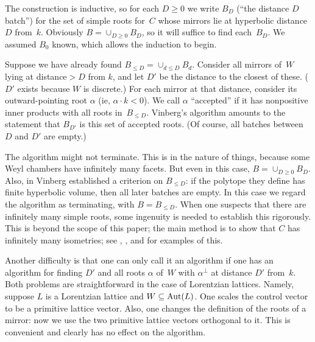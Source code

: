 \documentclass[12pt]{amsart}
\def\Aut{\mathop{\rm Aut}\nolimits}
\def\sset{\subseteq}
\numberwithin{theorem}{section}
\numberwithin{equation}{section}
\numberwithin{figure}{section}
\theoremstyle{remark}
\begin{document}
The construction is inductive, so for each 
$D\geq0$ we write $B_D$ (``the distance $D$ batch'') for the set 
of simple roots for~$C$ whose mirrors lie at hyperbolic distance~$D$
from~$k$.  Obviously  $B=\cup_{D\geq0}B_D$,
so it will suffice to find each~$B_D$.
We assumed $B_0$ known, which allows the induction to begin.

Suppose we have already found $B_{\leq D}=\cup_{d\leq D}B_{d}$.
Consider
all mirrors of~$W$ lying at distance${}>D$ from $k$, and let $D'$
be the distance to the closest of these.  ($D'$ exists because $W$ is discrete.)
For each mirror at that distance, consider its
outward-pointing root $\alpha$ (ie, $\alpha\cdot k<0$). We call $\alpha$ ``accepted''
if it has nonpositive inner products with 
all roots in~$B_{\leq D}$.   
Vinberg's algorithm amounts to the statement that $B_{D'}$ is this
set of accepted roots.  
(Of course, all batches between $D$ and
$D'$ are empty.)  

\medskip
The algorithm
might not terminate.  This is in the nature of things, because some
Weyl chambers have infinitely many facets.  
But even in this case, $B=\cup_{D\geq0}B_D$.
Also, in \cite[Prop.~5]{VinbergOnTheGroups}
Vinberg established a criterion on $B_{\leq D}$:  if the polytope they
define has finite hyperbolic volume,  then
all later batches are empty. 
In this case we regard the algorithm as terminating, with 
$B=B_{\leq D}$.
When one suspects that there are infinitely many simple roots,
some  ingenuity is needed to establish this rigorously.  
This is beyond the scope of this paper;   the
main method is to show that $C$ has infinitely many isometries;
see \cite[Theorem~5.5]{BorcherdsAutsOfLorentzianLattices}, 
\cite[II\S3]{NikulinRank3}, 
\cite[p.~20]{AllcockRank3} and 
\cite[Prop.~3.2]{ScharlauWalhorn} for examples of this.

\medskip
Another difficulty is that one can only call it an algorithm
if  one has an algorithm
for finding $D'$ and all roots $\alpha$ of~$W$ with $\alpha^\perp$ at 
distance $D'$ from~$k$.  
Both problems are straightforward in the case  of Lorentzian lattices.
Namely, suppose $L$ is  a Lorentzian lattice and $W\sset\Aut(L)$.
One scales the 
control vector  to be a primitive lattice
vector.  Also, one changes the definition of
the roots of a mirror: now we use the two primitive lattice vectors
orthogonal to it.     This is convenient and clearly has no effect on
the algorithm.
\end{document}
